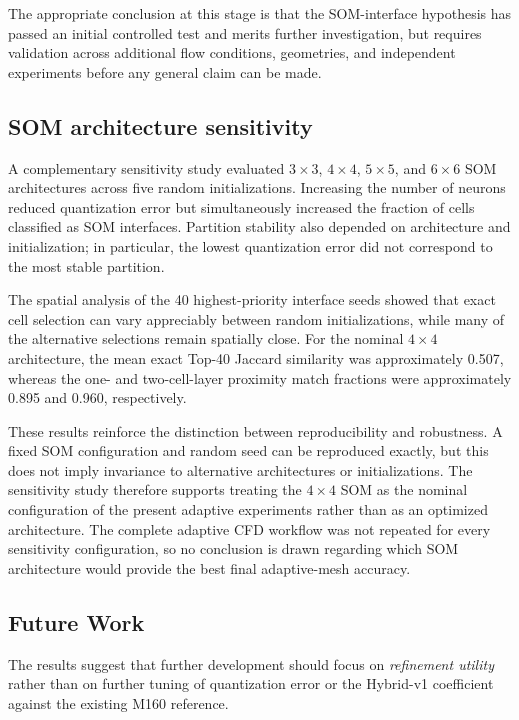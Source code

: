 The appropriate conclusion at this stage is that the SOM-interface
hypothesis has passed an initial controlled test and merits further
investigation, but requires validation across additional flow conditions,
geometries, and independent experiments before any general claim can be
made.


\subsection{SOM architecture sensitivity}

A complementary sensitivity study evaluated \(3\times3\), \(4\times4\),
\(5\times5\), and \(6\times6\) SOM architectures across five random
initializations. Increasing the number of neurons reduced quantization error
but simultaneously increased the fraction of cells classified as SOM
interfaces. Partition stability also depended on architecture and
initialization; in particular, the lowest quantization error did not
correspond to the most stable partition.

The spatial analysis of the 40 highest-priority interface seeds showed that
exact cell selection can vary appreciably between random initializations,
while many of the alternative selections remain spatially close. For the
nominal \(4\times4\) architecture, the mean exact Top-40 Jaccard similarity
was approximately 0.507, whereas the one- and two-cell-layer proximity match
fractions were approximately 0.895 and 0.960, respectively.

These results reinforce the distinction between reproducibility and
robustness. A fixed SOM configuration and random seed can be reproduced
exactly, but this does not imply invariance to alternative architectures or
initializations. The sensitivity study therefore supports treating the
\(4\times4\) SOM as the nominal configuration of the present adaptive
experiments rather than as an optimized architecture. The complete adaptive
CFD workflow was not repeated for every sensitivity configuration, so no
conclusion is drawn regarding which SOM architecture would provide the best
final adaptive-mesh accuracy.

\subsection{Future Work}

The results suggest that further development should focus on
\emph{refinement utility} rather than on further tuning of quantization
error or the Hybrid-v1 coefficient against the existing M160 reference.

